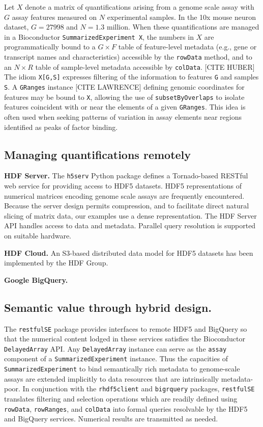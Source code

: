 \documentclass[applications]{gen-bioinformatics}
\begin{document}
Let $X$ denote a matrix of quantifications arising from a genome
scale assay with $G$ assay features measured on $N$ experimental
samples.  In the 10x mouse neuron dataset, $G = 27998$ and $N= 1.3$ million.
When these quantifications are managed in a Bioconductor \verb+SummarizedExperiment X+, the numbers in $X$ are programmatically bound to a $G \times F$
table of feature-level metadata (e.g., gene or transcript names and
characteristics) accessible by the \verb+rowData+ method, and to an $N \times R$ table of sample-level metadata accessible by \verb+colData+. 
[CITE HUBER] The idiom \verb+X[G,S]+ expresses filtering of 
the information
to features \verb+G+ and samples \verb+S+.  A \verb+GRanges+ 
instance [CITE LAWRENCE] defining genomic coordinates for features may be bound to \verb+X+,
allowing the use of \verb+subsetByOverlaps+ to isolate features
coincident with or near the elements of a given \verb+GRanges+.
This idea is often used when seeking patterns of variation in
assay elements near regions identified as peaks of factor binding.

\subsection*{Managing quantifications remotely}

\textbf{HDF Server.}  The \verb+h5serv+ Python package defines a Tornado-based RESTful web
service for providing access to HDF5 datasets.  HDF5 representations of
numerical matrices encoding genome scale assays are 
frequently encountered.  Because
the server design permits compression, and to facilitate direct natural 
slicing of matrix data, our examples use a dense representation.  The
HDF Server API handles access to data and metadata.  Parallel query
resolution is supported on suitable hardware.

\textbf{HDF Cloud.}  An S3-based distributed data model for HDF5
datasets has been implemented by the HDF Group.

\textbf{Google BigQuery.}  

\subsection*{Semantic value through hybrid design.}

The \verb+restfulSE+ package provides interfaces to remote HDF5
and BigQuery so that the numerical content lodged in these services
satisfies the Bioconductor \verb+DelayedArray+ API.  
Any \verb+DelayedArray+ instance can serve as the \verb+assay+
component of a \verb+SummarizedExperiment+ instance.  Thus the
capacities of \verb+SummarizedExperiment+ to bind semantically
rich metadata to genome-scale assays are extended implicitly to
data resources that are intrinsically metadata-poor.  In 
conjunction with the \verb+rhdf5client+ and \verb+bigrquery+ packages,
\verb+restfulSE+ translates filtering and selection operations
which are readily defined using \verb+rowData+, \verb+rowRanges+,
and \verb+colData+ into formal queries resolvable by the HDF5 and
BigQuery services.  Numerical results are transmitted as needed.
\end{document}
